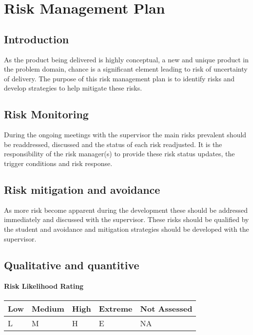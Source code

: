 \chapter{Risk Management Plan}

	\section{Introduction}
		As the product being delivered is highly conceptual, a new and unique product in the problem domain, chance is a significant element leading to risk of uncertainty of delivery.
		The purpose of this risk management plan is to identify risks and develop strategies to help mitigate these risks.
		\vspace{5mm}
	
	\section{Risk Monitoring}
		During the ongoing meetings with the supervisor the main risks prevalent should be readdressed, discussed and the status of each risk readjusted.
		It is the responsibility of the risk manager(s) to provide these risk status updates, the trigger conditions and risk response.  
		\vspace{5mm}
	
	\section{Risk mitigation and avoidance}
		As more risk become apparent during the development these should be addressed immediately and discussed with the supervisor.  
		These risks should be qualified by the student and avoidance and mitigation strategies should be developed with the supervisor.  
		\vspace{5mm}

	\section{Qualitative and quantitive}

	\subsubsection*{Risk Likelihood Rating}
	\vspace{2mm}

    	\begin{tabularx}{1.0\textwidth}{ | >{\scriptsize}X | >{\scriptsize}X | >{\scriptsize}X | >{\scriptsize}X | >{\scriptsize}X | }
			\hline

			\textbf{Low} 		& \textbf{Medium} 	& \textbf{High} 	& \textbf{Extreme} 	& \textbf{Not Assessed} 	\\ \hline
			L				 	& M 				& H 				& E 				& NA	 					\\ \hline
	
		\end{tabularx}
	
